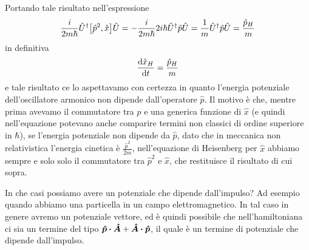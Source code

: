 \begin{soluzione}
   Portando tale risultato nell'espressione
   \begin{equation*}
      \frac{i}{2m\hbar} \hat{U}^{\dag}\qty[ \hat{p}^2, \hat{x} ]\hat{U}
      =-\frac{i}{2m\hbar} 2 i\hbar \hat{U}^{\dag} \hat{p}\hat{U}
      =\frac{1}{m} \hat{U}^{\dag} \hat{p}\hat{U}
      =\frac{\hat{p}_H}{m}
   \end{equation*}
   in definitiva
   \begin{equation*}
      \dv{\hat{x}_H}{t}
      =\frac{\hat{p}_H}{m}
   \end{equation*}
   e tale risultato ce lo aspettavamo con certezza in quanto l'energia potenziale dell'oscillatore armonico non dipende dall'operatore $\hat{p}$. Il motivo è che, mentre prima avevamo il commutatore tra $\hat{p}$ e una generica funzione di $\hat{x}$ (e quindi nell'equazione potevano anche comparire termini non classici di ordine superiore in $\hbar$), se l'energia potenziale non dipende da $\hat{p}$, dato che in meccanica non relativistica l'energia cinetica è $\frac{\hat{p}^2}{2m}$, nell'equazione di Heisenberg per $\hat{x}$ abbiamo sempre e solo solo il commutatore tra $\hat{p}^2$ e $\hat{x}$, che restituisce il risultato di cui sopra.
   
   In che casi possiamo avere un potenziale che dipende dall'impulso? Ad esempio quando abbiamo una particella in un campo elettromagnetico. In tal caso in genere avremo un potenziale vettore, ed è quindi possibile che nell'hamiltoniana ci sia un termine del tipo $\vu*{p} \vdot \vu*{A} + \vu*{A} \vdot \vu*{p}$, il quale è un termine di potenziale che dipende dall'impulso.
   

\end{soluzione}
